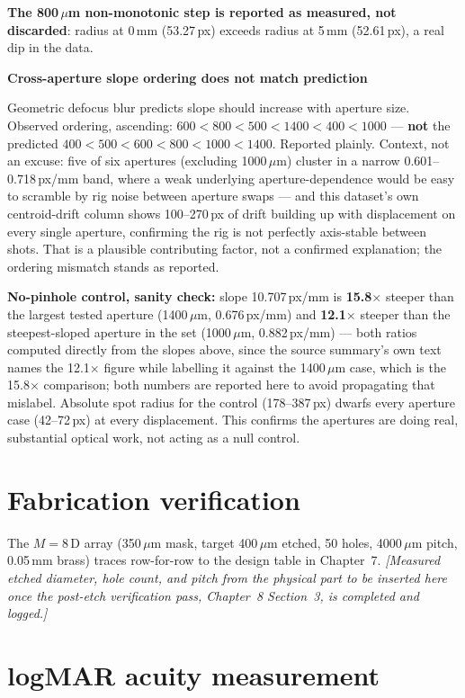 \documentclass[11pt]{report}
\newenvironment{warnbox}[1]%
{\par\vspace{6pt}\begin{lrbox}{\wbsave}\begin{minipage}{0.88\textwidth}%
{\bfseries\color{warnred}#1}\par\vspace{4pt}\ignorespaces}%
{\end{minipage}\end{lrbox}%
\begin{center}\setlength{\fboxrule}{1.2pt}\setlength{\fboxsep}{7pt}%
\fcolorbox{warnred}{white}{\usebox{\wbsave}}\end{center}\vspace{6pt}\par}
\begin{document}
\textbf{The 800\,$\mu$m non-monotonic step is reported as measured, not discarded}: radius
at 0\,mm (53.27\,px) exceeds radius at 5\,mm (52.61\,px), a real dip in the data.

\begin{warnbox}{Cross-aperture slope ordering does not match prediction}
Geometric defocus blur predicts slope should increase with aperture size. Observed
ordering, ascending: $600 < 800 < 500 < 1400 < 400 < 1000$ --- \textbf{not} the predicted
$400<500<600<800<1000<1400$. Reported plainly. Context, not an excuse: five of six
apertures (excluding 1000\,$\mu$m) cluster in a narrow 0.601--0.718\,px/mm band, where a
weak underlying aperture-dependence would be easy to scramble by rig noise between
aperture swaps --- and this dataset's own centroid-drift column shows 100--270\,px of
drift building up with displacement on every single aperture, confirming the rig is not
perfectly axis-stable between shots. That is a plausible contributing factor, not a
confirmed explanation; the ordering mismatch stands as reported.
\end{warnbox}

\textbf{No-pinhole control, sanity check:} slope 10.707\,px/mm is \textbf{15.8$\times$}
steeper than the largest tested aperture (1400\,$\mu$m, 0.676\,px/mm) and
\textbf{12.1$\times$} steeper than the steepest-sloped aperture in the set (1000\,$\mu$m,
0.882\,px/mm) --- both ratios computed directly from the slopes above, since the source
summary's own text names the 12.1$\times$ figure while labelling it against the
1400\,$\mu$m case, which is the 15.8$\times$ comparison; both numbers are reported here to
avoid propagating that mislabel. Absolute spot radius for the control (178--387\,px) dwarfs
every aperture case (42--72\,px) at every displacement. This confirms the apertures are
doing real, substantial optical work, not acting as a null control.

\section{Fabrication verification}

The $M=8$\,D array (350\,$\mu$m mask, target 400\,$\mu$m etched, 50 holes, 4000\,$\mu$m
pitch, 0.05\,mm brass) traces row-for-row to the design table in Chapter~7. \emph{[Measured
etched diameter, hole count, and pitch from the physical part to be inserted here once the
post-etch verification pass, Chapter~8 Section~3, is completed and logged.]}

\section{logMAR acuity measurement}
\end{document}
